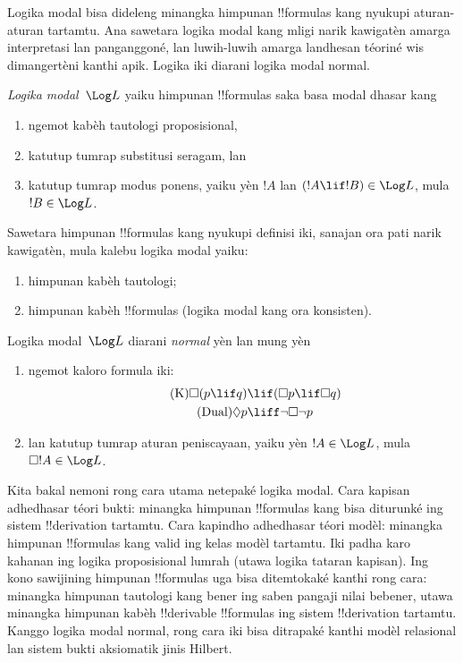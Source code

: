 \documentclass[../../../include/open-logic-section]{subfiles}
\begin{document}


Logika modal bisa dideleng minangka himpunan !!{formula}s
kang nyukupi aturan-aturan tartamtu. Ana sawetara
logika modal kang mligi narik kawigatèn amarga
interpretasi lan panganggoné, lan luwih-luwih amarga
landhesan téoriné wis dimangertèni kanthi apik.
Logika iki diarani logika modal normal.

\begin{defn}
\emph{Logika modal}~$\Log L$ yaiku himpunan
!!{formula}s saka basa modal dhasar kang
\begin{enumerate}
\item ngemot kabèh tautologi proposisional,
\item katutup tumrap substitusi seragam, lan
\item katutup tumrap modus ponens, yaiku yèn $!A$
  lan $(!A \lif !B) \in \Log L$, mula
  $!B \in \Log L$.
\end{enumerate}
\end{defn}

\begin{ex}
Sawetara himpunan !!{formula}s kang nyukupi definisi iki,
sanajan ora pati narik kawigatèn, mula kalebu logika modal yaiku:
\begin{enumerate}
\item himpunan kabèh tautologi;
\item himpunan kabèh !!{formula}s (logika modal kang ora konsisten).
\end{enumerate}
\end{ex}

\begin{defn}\label{defn:normal-modal-logic}
Logika modal~$\Log L$ diarani \emph{normal} yèn lan mung yèn
\begin{enumerate}
\item ngemot kaloro formula iki:
\begin{align}
\tag{K} \Box(p \lif q) & \lif (\Box p \lif \Box q) \\
\tag{Dual} \Diamond p & \liff \lnot \Box \lnot p
\end{align}
\item lan katutup tumrap aturan peniscayaan, yaiku
  yèn $!A \in \Log L$, mula $\Box !A \in \Log L$.
\end{enumerate}
\end{defn}

Kita bakal nemoni rong cara utama netepaké logika modal.
Cara kapisan adhedhasar téori bukti: minangka himpunan
!!{formula}s kang bisa diturunké ing sistem
!!{derivation} tartamtu. Cara kapindho adhedhasar
téori modèl: minangka himpunan !!{formula}s kang valid
ing kelas modèl tartamtu. Iki padha karo kahanan
ing logika proposisional lumrah (utawa logika tataran
kapisan). Ing kono sawijining himpunan !!{formula}s
uga bisa ditemtokaké kanthi rong cara: minangka
himpunan tautologi kang bener ing saben pangaji nilai
bebener, utawa minangka himpunan kabèh !!{derivable}
!!{formula}s ing sistem !!{derivation} tartamtu.
Kanggo logika modal normal, rong cara iki bisa
ditrapaké kanthi modèl relasional lan sistem bukti
aksiomatik jinis Hilbert.
\end{document}
